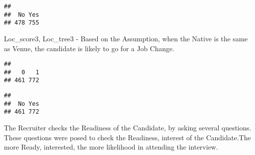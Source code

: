 \documentclass[]{article}
\newenvironment{Shaded}{\begin{snugshade}}{\end{snugshade}}
\newcommand{\KeywordTok}[1]{\textcolor[rgb]{0.13,0.29,0.53}{\textbf{#1}}}
\newcommand{\DecValTok}[1]{\textcolor[rgb]{0.00,0.00,0.81}{#1}}
\newcommand{\StringTok}[1]{\textcolor[rgb]{0.31,0.60,0.02}{#1}}
\newcommand{\ControlFlowTok}[1]{\textcolor[rgb]{0.13,0.29,0.53}{\textbf{#1}}}
\newcommand{\OperatorTok}[1]{\textcolor[rgb]{0.81,0.36,0.00}{\textbf{#1}}}
\newcommand{\NormalTok}[1]{#1}
\begin{document}
\begin{verbatim}
## 
##  No Yes 
## 478 755
\end{verbatim}

Loc\_score3, Loc\_tree3 - Based on the Assumption, when the Native is
the same as Venue, the candidate is likely to go for a Job Change.

\begin{Shaded}
\end{Shaded}

\begin{verbatim}
## 
##   0   1 
## 461 772
\end{verbatim}

\begin{Shaded}
\end{Shaded}

\begin{verbatim}
## 
##  No Yes 
## 461 772
\end{verbatim}

The Recruiter checks the Readiness of the Candidate, by asking several
questions. These questions were posed to check the Readiness, interest
of the Candidate.The more Ready, interested, the more likelihood in
attending the interview.
\end{document}
